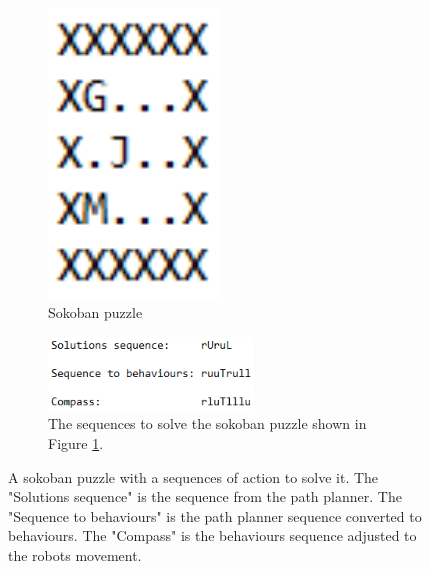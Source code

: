 \documentclass[../report.tex]{subfiles}
\begin{document}
\begin{figure}[H]
    \centering
    \begin{subfigure}[t]{0.2\textwidth}
        \centering
        \includegraphics[width=0.5\textwidth]{figures/glue/easy.png}
        \caption{Sokoban puzzle}
        \label{subfig:easy_puzzle}
    \end{subfigure}
    \begin{subfigure}[t]{0.79\textwidth}
        \centering
        \includegraphics[width=0.6\textwidth]{figures/glue/sequences.png}
        \captionsetup{width=0.9\textwidth}
        \caption{The sequences to solve the sokoban puzzle shown in Figure \ref{subfig:easy_puzzle}.}
        \label{subfig:easy_sequences}
    \end{subfigure}
    \caption{A sokoban puzzle with a sequences of action to solve it. The "Solutions sequence" is the sequence from the path planner. The "Sequence to behaviours" is the path planner sequence converted to behaviours. The "Compass" is the behaviours sequence adjusted to the robots movement.}
    \label{fig:easy}
\end{figure}
\end{document}
